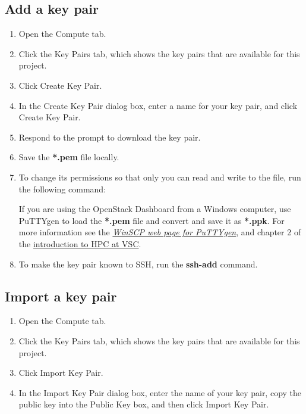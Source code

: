 \subsection*{Add a key pair}\label{add-a-key-pair}
\begin{enumerate}
\item Open the Compute tab.
\item Click the Key Pairs tab, which shows the key pairs that are
  available for this project.
\item Click Create Key Pair.
\item In the Create Key Pair dialog box, enter a name for your key
  pair, and click Create Key Pair.
\item Respond to the prompt to download the key pair.
\item Save the \textbf{*.pem} file locally.
\item To change its permissions so that only you can read and write to
  the file, run the following command:

  \begin{prompt}
  \end{prompt}

   If you are using the \gls{OpenStack Dashboard} from a
  Windows computer, use PuTTYgen to load the \textbf{*.pem} file and
  convert and save it as \textbf{*.ppk}.  For more information see the
  \href{https://winscp.net/eng/docs/ui_puttygen}{\emph{WinSCP web page
      for PuTTYgen}}, and chapter 2 of the
  \href{https://hpcugent.github.io/vsc\_user\_docs}{introduction to
    HPC at VSC}.

\item To make the key pair known to SSH, run the \textbf{ssh-add}
  command.

  \begin{prompt}
  \end{prompt}
\end{enumerate}

\subsection*{Import a key pair}\label{import-a-key-pair}
\begin{enumerate}
\item Open the Compute tab.
\item Click the Key Pairs tab, which shows the key pairs that are
  available for this project.
\item Click Import Key Pair.
\item In the Import Key Pair dialog box, enter the name of your key
  pair, copy the public key into the Public Key box, and then click
  Import Key Pair.
\end{enumerate}

